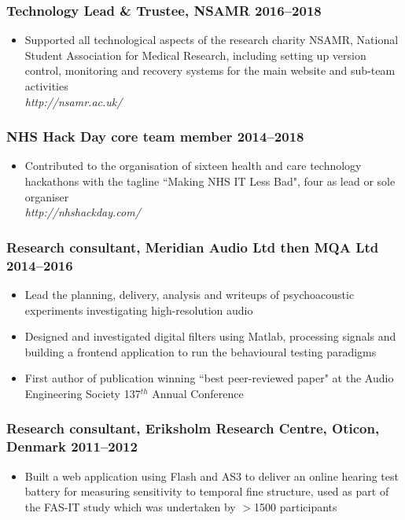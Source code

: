 \documentclass[a4paper, oneside, final, 11pt]{scrartcl} %
\begin{document}
\smallskip 
				
\subsubsection*{Technology Lead \& Trustee, NSAMR \hfill 2016--2018}  
\normalfont
\begin{itemize}
	\item Supported all technological aspects of the research charity NSAMR, National Student Association for Medical Research, including setting up version control, monitoring and recovery systems for the main website and sub-team activities\\
	\textit{http://nsamr.ac.uk/}
\end{itemize}

\smallskip 

\subsubsection*{NHS Hack Day core team member \hfill 2014--2018}  
\normalfont
\begin{itemize}
	\item Contributed to the organisation of sixteen health and care technology hackathons with the tagline ``Making NHS IT Less Bad", four as lead or sole organiser\\
	\textit{http://nhshackday.com/}
\end{itemize}

\smallskip 
				
\subsubsection*{Research consultant, Meridian Audio Ltd then MQA Ltd \hfill 2014--2016}  
\normalfont
\begin{itemize}
	\item Lead the planning, delivery, analysis and writeups of psychoacoustic experiments investigating high-resolution audio
	\item Designed and investigated digital filters using Matlab, processing signals and building a frontend application to run the behavioural testing paradigms
	\item First author of publication winning ``best peer-reviewed paper" at the Audio Engineering Society 137$^{th}$ Annual Conference
\end{itemize}

\smallskip 
				
\subsubsection*{Research consultant, Eriksholm Research Centre, Oticon, Denmark \hfill 2011--2012}  
\normalfont
\begin{itemize}
	\item Built a web application using Flash and AS3 to deliver an online hearing test battery for measuring sensitivity to temporal fine structure, used as part of the FAS-IT study which was undertaken by $>$1500 participants
\end{itemize}
\end{document}
